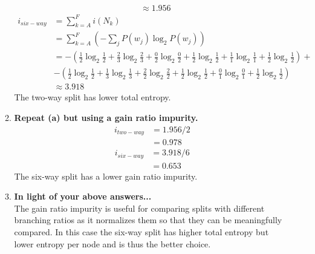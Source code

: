 \documentclass[12pt]{article}
\begin{document}
\begin{enumerate}
\begin{enumerate}
\begin{equation}
\begin{split}
& \approx 1.956
\end{split}
\end{equation}
\begin{equation}
\begin{split}
i_{six-way} &= \sum_{k=A}^Fi(N_k) \\
&= \sum_{k=A}^F\left (-\sum_jP(w_j)\log_2P(w_j)\right) \\
&= -(\frac{1}{2}\log_2\frac{1}{2} + \frac{2}{3}\log_2\frac{2}{3} + \frac{0}{2}\log_2\frac{0}{2} + \frac{1}{2}\log_2\frac{1}{2} + \frac{1}{1}\log_2\frac{1}{1} + \frac{1}{2}\log_2\frac{1}{2}) + \\
& -(\frac{1}{2}\log_2\frac{1}{2} + \frac{1}{3}\log_2\frac{1}{3} + \frac{2}{2}\log_2\frac{2}{2} + \frac{1}{2}\log_2\frac{1}{2} + \frac{0}{1}\log_2\frac{0}{1} + \frac{1}{2}\log_2\frac{1}{2}) \\
& \approx 3.918
\end{split}
\end{equation}
The two-way split has lower total entropy.
\item \textbf{Repeat (a) but using a gain ratio impurity.}
\begin{equation}
\begin{split}
i_{two-way} &= 1.956 / 2 \\
&=0.978
\end{split}
\end{equation}
\begin{equation}
\begin{split}
i_{six-way} &= 3.918 / 6 \\
&=0.653
\end{split}
\end{equation}
The six-way split has a lower gain ratio impurity.
\item \textbf{In light of your above answers...} \\
The gain ratio impurity is useful for comparing splits with different branching ratios as it normalizes them so that they can be meaningfully compared. In this case the six-way split has higher total entropy but lower entropy per node and is thus the better choice.
\end{enumerate}
\end{enumerate}
\end{document}
